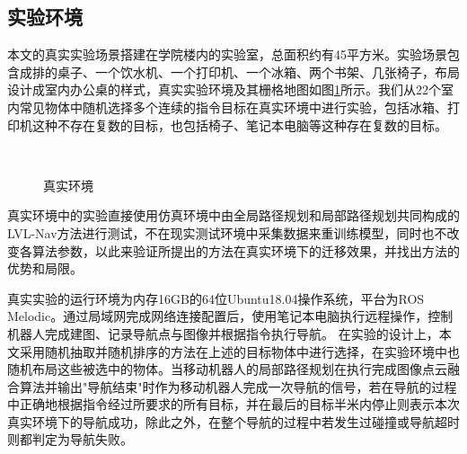 \subsection{实验环境}
本文的真实实验场景搭建在学院楼内的实验室，总面积约有45平方米。实验场景包含成排的桌子、一个饮水机、一个打印机、一个冰箱、两个书架、几张椅子，布局设计成室内办公桌的样式，真实实验环境及其栅格地图如图\ref{myrealenv}所示。我们从22个室内常见物体中随机选择多个连续的指令目标在真实环境中进行实验，包括冰箱、打印机这种不存在复数的目标，也包括椅子、笔记本电脑等这种存在复数的目标。
\begin{figure}[h]
    \centering
    \\
    \caption{真实环境}
    \label{myrealenv}
\end{figure}
真实环境中的实验直接使用仿真环境中由全局路径规划和局部路径规划共同构成的LVL-Nav方法进行测试，不在现实测试环境中采集数据来重训练模型，同时也不改变各算法参数，以此来验证所提出的方法在真实环境下的迁移效果，并找出方法的优势和局限。

真实实验的运行环境为内存16GB的64位Ubuntu18.04操作系统，平台为ROS Melodic。通过局域网完成网络连接配置后，使用笔记本电脑执行远程操作，控制机器人完成建图、记录导航点与图像并根据指令执行导航。
在实验的设计上，本文采用随机抽取并随机排序的方法在上述的目标物体中进行选择，在实验环境中也随机布局这些被选中的物体。当移动机器人的局部路径规划在执行完成图像点云融合算法并输出"导航结束"时作为移动机器人完成一次导航的信号，若在导航的过程中正确地根据指令经过所要求的所有目标，并在最后的目标半米内停止则表示本次真实环境下的导航成功，除此之外，在整个导航的过程中若发生过碰撞或导航超时则都判定为导航失败。



